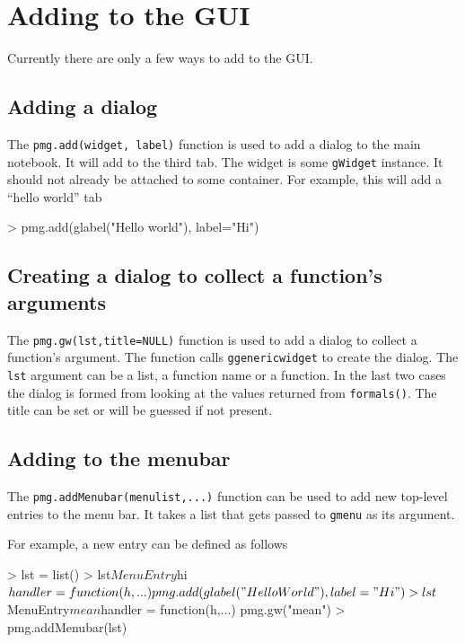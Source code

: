 \documentclass[12pt]{article}
\newcommand{\RCode}[1]{\texttt{#1}}
\begin{document}
\section{Adding to the GUI}

Currently there are only a few ways to add to the GUI.

\subsection{Adding a dialog}

The \RCode{pmg.add(widget, label)} function is used to add a dialog to
the main notebook. It will add to the third tab. The widget is some
\RCode{gWidget} instance. It should not already be attached to some
container. For example, this will add a ``hello world'' tab
\begin{Sinput}
> pmg.add(glabel("Hello world"), label="Hi")
\end{Sinput}

\subsection{Creating a dialog to collect a function's arguments}

The \RCode{pmg.gw(lst,title=NULL)} function is used to add a dialog to collect a
function's argument. The function calls \RCode{ggenericwidget} to
create the dialog. The \RCode{lst} argument can be a list, a function
name or a function. In the last two cases the dialog is formed from
looking at the values returned from \RCode{formals()}. The title can
be set or will be guessed if not present.


\subsection{Adding to the menubar}

The \RCode{pmg.addMenubar(menulist,...)} function can be used to add new top-level
entries  to the menu bar. It takes a list that gets passed to
\RCode{gmenu} as its argument. 

For example, a new entry can be defined as follows
\begin{Sinput}
> lst = list()
> lst$MenuEntry$hi$handler = function(h,...) pmg.add(glabel("HelloWorld"), label="Hi")
> lst$MenuEntry$mean$handler = function(h,...) pmg.gw("mean")
> pmg.addMenubar(lst)
\end{Sinput}
\end{document}
